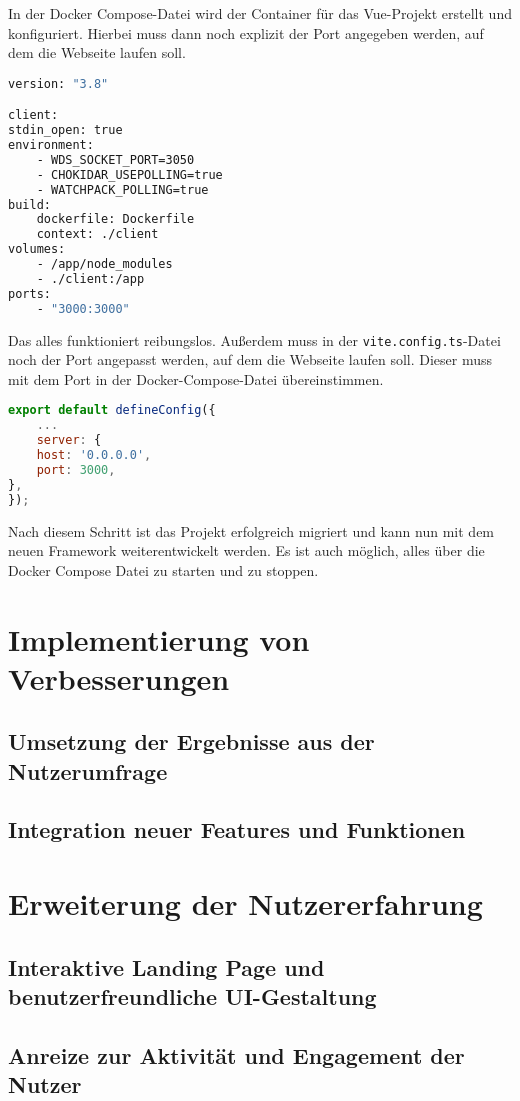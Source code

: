 In der Docker Compose-Datei wird der Container für das Vue-Projekt erstellt und konfiguriert. Hierbei muss dann noch explizit der Port angegeben werden, auf dem die Webseite laufen soll.

\begin{lstlisting}[language={bash}, caption={Docker Compose für das Vue Projekt}]
version: "3.8"

client:
stdin_open: true
environment:
    - WDS_SOCKET_PORT=3050
    - CHOKIDAR_USEPOLLING=true
    - WATCHPACK_POLLING=true
build:
    dockerfile: Dockerfile
    context: ./client
volumes:
    - /app/node_modules
    - ./client:/app
ports:
    - "3000:3000"
\end{lstlisting}

Das alles funktioniert reibungslos. Außerdem muss in der \texttt{vite.config.ts}-Datei noch der Port angepasst werden, auf dem die Webseite laufen soll. Dieser muss mit dem Port in der Docker-Compose-Datei übereinstimmen.

\begin{lstlisting}[language={JavaScript}, caption={Port Konfiguration für das Vue Projekt}]
export default defineConfig({
    ...
    server: {
    host: '0.0.0.0',
    port: 3000,
},
});
\end{lstlisting}

Nach diesem Schritt ist das Projekt erfolgreich migriert und kann nun mit dem neuen Framework weiterentwickelt werden. Es ist auch möglich, alles über die Docker Compose Datei zu starten und zu stoppen.

\section{Implementierung von Verbesserungen }


\subsection{Umsetzung der Ergebnisse aus der Nutzerumfrage}

\subsection{Integration neuer Features und Funktionen}

\section{Erweiterung der Nutzererfahrung}

\subsection{Interaktive Landing Page und benutzerfreundliche UI-Gestaltung}

\subsection{Anreize zur Aktivität und Engagement der Nutzer}

